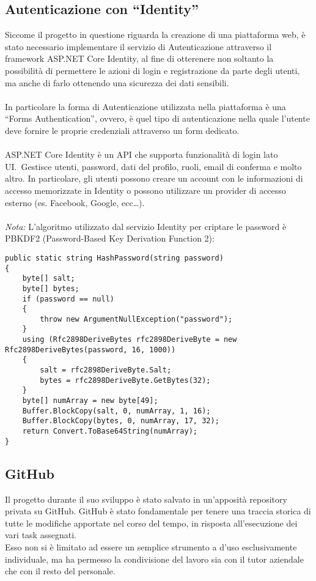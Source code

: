 \subsection{Autenticazione con ``Identity''}\label{sec:cap_sec_subsec}
Siccome il progetto in questione riguarda la creazione di una piattaforma web, è stato necessario
implementare il servizio di Autenticazione attraverso il framework ASP.NET Core Identity, al
fine di otterenere non soltanto la possibilità di permettere le azioni di login e registrazione da parte degli utenti, ma
anche di farlo ottenendo una sicurezza dei dati sensibili. 
\\ \\
In particolare la forma di Autenticazione utilizzata nella piattaforma è una ``Forms Authentication'', ovvero, è quel tipo di
autenticazione nella quale l'utente deve fornire le proprie credenziali attraverso un form dedicato. 
\\ \\
ASP.NET Core Identity è un API che supporta funzionalità di login lato UI.\ Gestisce utenti,
password, dati del profilo, ruoli, email di conferma e molto altro.
In particolare, gli utenti possono creare un account con le informazioni di accesso memorizzate in Identity 
o possono utilizzare un provider di accesso esterno (es. Facebook, Google, ecc\dots ).
\\ \\
\textit{Nota:} L'algoritmo utilizzato dal servizio Identity per criptare le password è PBKDF2 (Password-Based Key Derivation Function 2):
\begin{lstlisting}[style=cs_style, caption=algoritmo di hashing per criptare le password usato dal servizio Identity]
public static string HashPassword(string password)
{
    byte[] salt;
    byte[] bytes;
    if (password == null)
    {
        throw new ArgumentNullException("password");
    }
    using (Rfc2898DeriveBytes rfc2898DeriveByte = new Rfc2898DeriveBytes(password, 16, 1000))
    {
        salt = rfc2898DeriveByte.Salt;
        bytes = rfc2898DeriveByte.GetBytes(32);
    }
    byte[] numArray = new byte[49];
    Buffer.BlockCopy(salt, 0, numArray, 1, 16);
    Buffer.BlockCopy(bytes, 0, numArray, 17, 32);
    return Convert.ToBase64String(numArray);
}
    \end{lstlisting}


\subsection{GitHub}\label{sec:cap_sec_subsec}
Il progetto durante il suo sviluppo è stato salvato in un'apposità repository privata
su GitHub.
GitHub è stato fondamentale per tenere una traccia storica di tutte le
modifiche apportate nel corso del tempo, in risposta all'esecuzione dei vari task assegnati. \\
Esso non si è limitato ad essere un semplice strumento a d'uso esclusivamente
individuale, ma ha permesso la condivisione del lavoro sia con il tutor 
aziendale che con il resto del personale.
